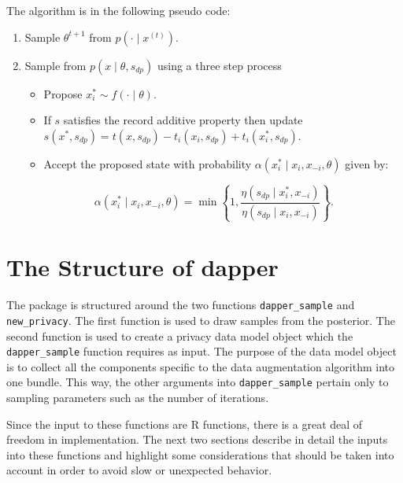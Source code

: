 The algorithm is in the following pseudo code:

\begin{enumerate}
\def\labelenumi{\arabic{enumi}.}
\tightlist
\item
  Sample \(\theta^{t+1}\) from \(p(\cdot \mid x^{(t)})\).
\item
  Sample from \(p(x \mid \theta, s_{dp})\) using a three step process

  \begin{itemize}
  \tightlist
  \item
    Propose \(x_{i}^{*} \sim f(\cdot \mid \theta)\).
  \item
    If \(s\) satisfies the record additive property then
    update \(s(x^*, s_{dp}) = t(x,s_{dp}) - t_i(x_i,s_{dp}) + t_{i}(x_i^*, s_{dp})\).
  \item
    Accept the proposed state with probability \(\alpha(x_i^* \mid x_i, x_{-i}, \theta)\)
    given by:
  \end{itemize}

  \[
     \alpha(x_i^* \mid x_i, x_{-i}, \theta) = \min \left\{ 1, \dfrac{\eta(s_{dp} \mid x_i^*, x_{-i})}{\eta(s_{dp} \mid x_i, x_{-i})} \right\}.
   \]
\end{enumerate}

\hypertarget{the-structure-of-dapper}{%
\section{The Structure of dapper}\label{the-structure-of-dapper}}

The package is structured around the two functions \texttt{dapper\_sample} and
\texttt{new\_privacy}. The first function is used to draw samples from the
posterior. The second function is used to create a privacy data model object
which the \texttt{dapper\_sample} function requires as input. The purpose of the data model
object is to collect all the components specific to the data augmentation algorithm
into one bundle. This way, the other arguments into \texttt{dapper\_sample} pertain only
to sampling parameters such as the number of iterations.

Since the input to these functions are R functions, there is a great deal of freedom
in implementation. The next two sections describe in detail the inputs into
these functions and highlight some considerations that should be taken
into account in order to avoid slow or unexpected behavior.

